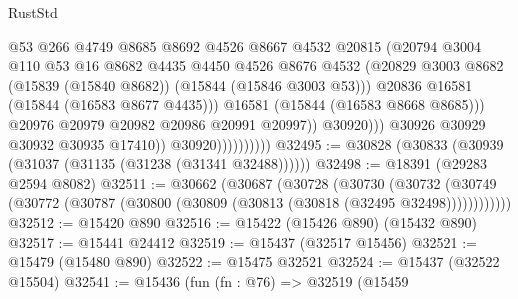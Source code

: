 \begin{lexlean}{RustStd}
\begin{coremodule}
                                        @53
                                        @266
                                        @4749
                                        @8685
                                        @8692
                                        @4526
                                        @8667
                                        @4532
                                        @20815
                                        (@20794
                                          @3004
                                          @110
                                          @53
                                          @16
                                          @8682
                                          @4435
                                          @4450
                                          @4526
                                          @8676
                                          @4532
                                          (@20829
                                            @3003
                                            @8682
                                            (@15839 (@15840 @8682))
                                            (@15844 (@15846 @3003 @53)))
                                          @20836
                                          @16581
                                          (@15844 (@16583 @8677 @4435)))
                                        @16581
                                        (@15844 (@16583 @8668 @8685)))
                                      @20976
                                      @20979
                                      @20982
                                      @20986
                                      @20991
                                      @20997))
                                  @30920)))
                            @30926
                            @30929
                            @30932
                            @30935
                            @17410))
                        @30920))))))))))
@32495 := @30828 (@30833 (@30939 (@31037 (@31135 (@31238 (@31341 @32488))))))
@32498 := @18391 (@29283 @2594 @8082)
@32511 := @30662
    (@30687
      (@30728
        (@30730
          (@30732 (@30749 (@30772 (@30787 (@30800 (@30809 (@30813 (@30818 (@32495 @32498))))))))))))
@32512 := @15420 @890
@32516 := @15422 (@15426 @890) (@15432 @890)
@32517 := @15441 @24412
@32519 := @15437 (@32517 @15456)
@32521 := @15479 (@15480 @890)
@32522 := @15475 @32521
@32524 := @15437 (@32522 @15504)
@32541 := @15436
    (fun (fn : @76) =>
    @32519
      (@15459

\end{coremodule}
\end{lexlean}
